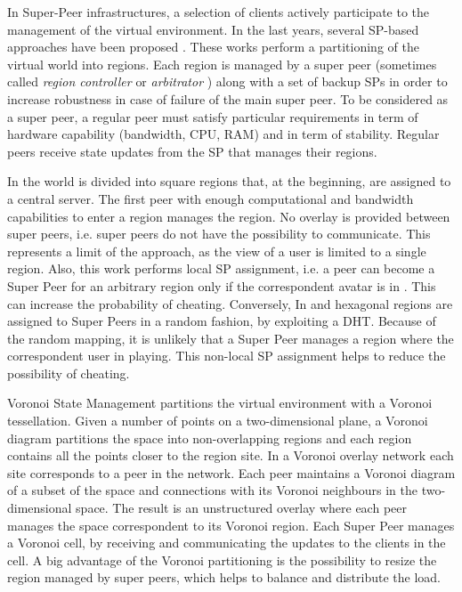 \documentclass[final,10pt,a5paper]{phdimt}
\theoremstyle{definition}
\begin{document}
In Super-Peer infrastructures, a selection of clients actively participate to the management of the virtual environment.
In the last years, several SP-based approaches have been proposed \cite{Kim2004,hu2008voronoi,Hampel2006,Vuong2005}.
These works perform a partitioning of the virtual world into regions.
Each region is managed by a super peer (sometimes called \textit{region controller} \cite{Hampel2006} or \textit{arbitrator} \cite{hu2008voronoi}) along with a set of backup SPs in order to increase robustness in case of failure of the main super peer.
To be considered as a super peer, a regular peer must satisfy particular requirements in term of hardware capability (bandwidth, CPU, RAM) and in term of stability. 
Regular peers receive state updates from the SP that manages their regions.


In \cite{Kim2004} the world is divided into square regions that, at the beginning, are assigned to a central server.
The first peer with enough computational and bandwidth capabilities to enter a region manages the region.
No overlay is provided between super peers, i.e. super peers do not have the possibility to communicate.
This represents a limit of the approach, as the view of a user is limited to a single region.
Also, this work performs local SP assignment, i.e. a peer can become a Super Peer for an arbitrary region  only if the correspondent avatar is in .  This can increase the probability of cheating.
Conversely, In \cite{Hampel2006} and \cite{Vuong2005} hexagonal regions are assigned to Super Peers in a random fashion, by exploiting a DHT.
Because of the random mapping, it is unlikely that a Super Peer manages a region where the correspondent user in playing.
This non-local SP assignment helps to reduce the possibility of cheating.

Voronoi State Management \cite{hu2008voronoi} partitions the virtual environment with a Voronoi tessellation.
Given a number  of points on a two-dimensional plane, a Voronoi diagram partitions the space into  non-overlapping regions and each region contains all the points closer to the region site. 
In a Voronoi overlay network each site corresponds to a peer in the network. 
Each peer  maintains a Voronoi diagram of a subset of the space and connections with its Voronoi neighbours in the two-dimensional space.
The result is an unstructured overlay where each peer manages the space correspondent to its Voronoi region.
Each Super Peer manages a Voronoi cell, by receiving and communicating the updates to the clients in the cell.
A big advantage of the Voronoi partitioning is the possibility to resize the region managed by super peers, which helps to balance and distribute the load.
\end{document}
